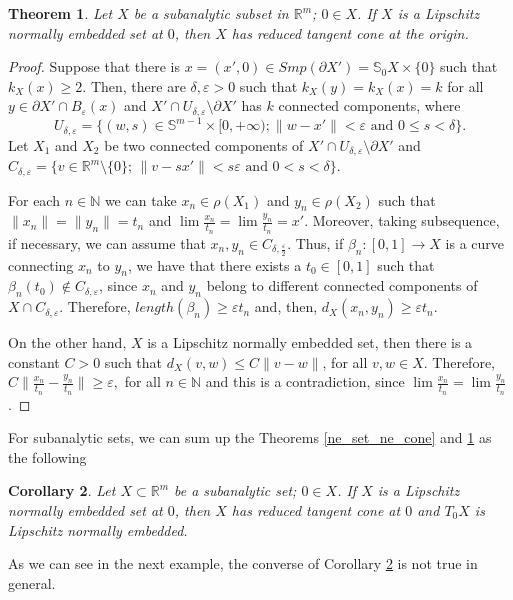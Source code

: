 \documentclass{amsart}
\newtheorem{theorem}{Theorem}[section]
\newtheorem{corollary}[theorem]{Corollary}
\newcommand{\R}{\mathbb{R}}
\newcommand{\N}{\mathbb{N}}
\begin{document}
\begin{theorem}
\label{multiplicities}
 Let $X$ be a subanalytic subset in $\R^m$; $0\in X$. If $X$ is a Lipschitz normally embedded set at $0$, then $X$ has reduced tangent cone at the origin.
\end{theorem}
\begin{proof}

Suppose that there is $x=(x',0)\in Smp(\partial X')=\mathbb{S}_0X\times \{0\}$ such that $k_X(x)\geq 2$. Then, there are $\delta,\varepsilon>0$ such that $k_X(y)=k_X(x)=k$ for all $y\in \partial X'\cap B_{\varepsilon}(x)$ and $X'\cap U_{\delta,\varepsilon}\setminus \partial X'$ has $k$ connected components, where
$$
U_{\delta,\varepsilon}=\{(w,s)\in \mathbb{S}^{m-1}\times [0,+\infty); \|w-x'\|<\varepsilon\mbox{ and }0\leq s<\delta\}.
$$
Let $X_1$ and $X_2$ be two connected components of $X'\cap U_{\delta,\varepsilon}\setminus \partial X'$ and $C_{\delta,\varepsilon}=\{v\in\R^m\setminus\{0\};\, \|v-sx'\|<s\varepsilon \mbox{ and }0<s<\delta\}$.

For each $n\in \N$ we can take $x_n\in \rho(X_1)$ and $y_n\in \rho(X_2)$ such that $\|x_n\|=\|y_n\|=t_n$ and $\lim \frac{x_n}{t_n}=\lim\frac{y_n}{t_n}=x'$. Moreover, taking subsequence, if necessary, we can assume that $x_n, y_n\in C_{\delta,\frac{\varepsilon}{2}}$. Thus, if $\beta_n:[0,1]\to X$ is a curve connecting $x_n$ to $y_n$, we have that there exists a $t_0\in [0,1]$ such that $\beta_n(t_0)\not \in C_{\delta,\varepsilon}$, since $x_n$ and $y_n$ belong to different connected components of $X\cap C_{\delta,\varepsilon}$. Therefore, $length(\beta_n)\geq \varepsilon t_n$ and, then, $d_X(x_n,y_n)\geq \varepsilon t_n$.

On the other hand, $X$ is a Lipschitz normally embedded set, then there is a constant $C>0$ such that $d_X(v,w)\leq C\|v-w\|$, for all $v,w\in X$. Therefore, $C\|\frac{x_n}{t_n}-\frac{y_n}{t_n}\|\geq \varepsilon,$ for all $n\in \N$
and this is a contradiction, since $\lim\frac{x_n}{t_n}=\lim\frac{y_n}{t_n}$.
\end{proof}
For subanalytic sets, we can sum up the Theorems \ref{ne_set_ne_cone} and \ref{multiplicities} as the following
\begin{corollary}\label{red-nn}
 Let $X\subset\R^m$ be a subanalytic set; $0\in X$. If $X$ is a Lipschitz normally embedded set at $0$, then $X$ has reduced tangent cone at $0$ and $T_0X$ is Lipschitz normally embedded.
\end{corollary}
As we can see in the next example, the converse of Corollary \ref{red-nn} is not true in general.
\end{document}
